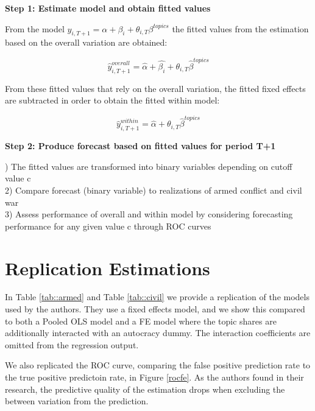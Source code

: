 \noindent\textbf{Step 1: Estimate model and obtain fitted values}

\noindent From the model $y_{i,T+1} = \alpha + \beta_{i} + \theta_{i,T}\beta^{topics}$ the fitted values from the estimation based on the overall variation are obtained:

\begin{equation}
    \hat{y}_{i,T+1}^{overall} = \hat{\alpha} + \hat{\beta_i} + \theta_{i,T}\hat{\beta}^{topics}
\end{equation}

\noindent From these fitted values that rely on the overall variation, the fitted fixed effects are subtracted in order to obtain the fitted within model:

\begin{equation}
    \hat{y}_{i,T+1}^{within} = \hat{\alpha} + \theta_{i,T}\hat{\beta}^{topics}
\end{equation}

\noindent \textbf{Step 2: Produce forecast based on fitted values for period T+1}

) The fitted values are transformed into binary variables depending on cutoff value c\\
2) Compare forecast (binary variable) to realizations of armed conflict and civil war\\
3) Assess performance of overall and within model by considering forecasting performance for any given value c through ROC curves

\section{Replication Estimations}
In Table \ref{tab::armed} and Table \ref{tab::civil} we provide a replication of the models used by the authors.
They use a fixed effects model, and we show this compared to both a Pooled OLS model and a FE model where the topic shares are additionally interacted with an autocracy dummy. The interaction coefficients are omitted from the regression output.

We also replicated the ROC curve, comparing the false positive prediction rate to the true positive predictoin rate, in Figure \ref{rocfe}.
As the authors found in their research, the predictive quality of the estimation drops when excluding the between variation from the prediction.

